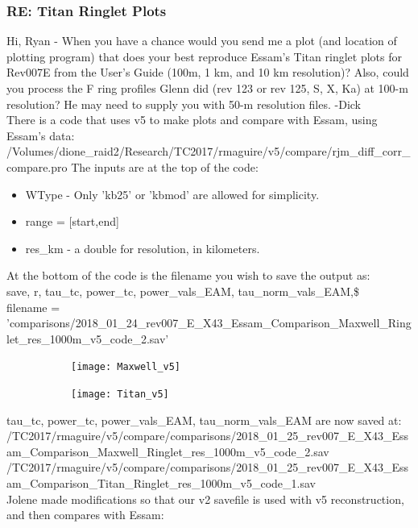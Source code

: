 \documentclass[crop=false,class=article,oneside]{standalone}
\begin{document}
\subsubsection{\footnotesize RE: Titan Ringlet Plots}
Hi, Ryan - When you have a chance would you send me a plot (and location of plotting program) that does your best reproduce Essam's Titan ringlet plots for Rev007E from the User's Guide (100m, 1 km, and 10 km resolution)? 
Also, could you process the F ring profiles Glenn did (rev 123 or rev 125, S, X, Ka) at 100-m resolution? He may need to supply you with 50-m resolution files. -Dick\\
There is a code that uses v5 to make plots and compare with Essam, using Essam's data:\\
/Volumes/dione\_raid2/Research/TC2017/rmaguire/v5/compare/rjm\_diff\_corr\_compare.pro
The inputs are at the top of the code:
\begin{itemize}
    \item WType - Only 'kb25' or 'kbmod' are allowed for simplicity.
    \item range = [start,end]
    \item res\_km - a double for resolution, in kilometers.
\end{itemize}
At the bottom of the code is the filename you wish to save the output as:\\
save, r, tau\_tc, power\_tc, power\_vals\_EAM, tau\_norm\_vals\_EAM,\$\\
filename = 'comparisons/2018\_01\_24\_rev007\_E\_X43\_Essam\_Comparison\_Maxwell\_Ringlet\_res\_1000m\_v5\_code\_2.sav'
\begin{figure}[H]
    \centering
    \begin{subfigure}[b]{0.49\textwidth}
        \texttt{[image: Maxwell\_v5]}
    \end{subfigure}
    \begin{subfigure}[b]{0.49\textwidth}
        \texttt{[image: Titan\_v5]}
    \end{subfigure}
\end{figure}
tau\_tc, power\_tc, power\_vals\_EAM, tau\_norm\_vals\_EAM are now saved at:\\
/TC2017/rmaguire/v5/compare/comparisons/2018\_01\_25\_rev007\_E\_X43\_Essam\_Comparison\_Maxwell\_Ringlet\_res\_1000m\_v5\_code\_2.sav\\
/TC2017/rmaguire/v5/compare/comparisons/2018\_01\_25\_rev007\_E\_X43\_Essam\_Comparison\_Titan\_Ringlet\_res\_1000m\_v5\_code\_1.sav\\
Jolene made modifications so that our v2 savefile is used with v5 reconstruction, and then compares with Essam:\\
\end{document}
